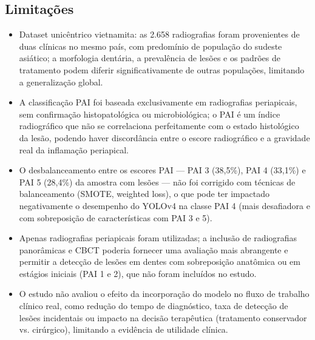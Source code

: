 \subsection{Limitações}
\begin{itemize}
  \item Dataset unicêntrico vietnamita: as 2.658 radiografias foram
        provenientes de duas clínicas no mesmo país, com predomínio
        de população do sudeste asiático; a morfologia dentária,
        a prevalência de lesões e os padrões de tratamento podem
        diferir significativamente de outras populações, limitando
        a generalização global.
  \item A classificação PAI foi baseada exclusivamente em radiografias
        periapicais, sem confirmação histopatológica ou microbiológica;
        o PAI é um índice radiográfico que não se correlaciona
        perfeitamente com o estado histológico da lesão, podendo
        haver discordância entre o escore radiográfico e a gravidade
        real da inflamação periapical.
  \item O desbalanceamento entre os escores PAI — PAI 3 (38,5\%),
        PAI 4 (33,1\%) e PAI 5 (28,4\%) da amostra com lesões —
        não foi corrigido com técnicas de balanceamento (SMOTE,
        weighted loss), o que pode ter impactado negativamente o
        desempenho do YOLOv4 na classe PAI 4 (mais desafiadora e com
        sobreposição de características com PAI 3 e 5).
  \item Apenas radiografias periapicais foram utilizadas; a inclusão
        de radiografias panorâmicas e CBCT poderia fornecer uma
        avaliação mais abrangente e permitir a detecção de lesões
        em dentes com sobreposição anatômica ou em estágios iniciais
        (PAI 1 e 2), que não foram incluídos no estudo.
  \item O estudo não avaliou o efeito da incorporação do modelo no
        fluxo de trabalho clínico real, como redução do tempo de
        diagnóstico, taxa de detecção de lesões incidentais ou
        impacto na decisão terapêutica (tratamento conservador vs.
        cirúrgico), limitando a evidência de utilidade clínica.
\end{itemize}

